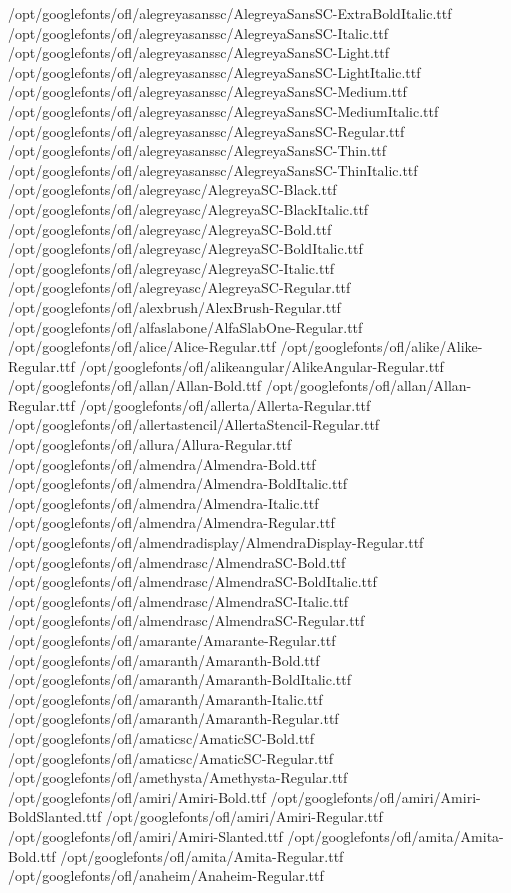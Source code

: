 /opt/googlefonts/ofl/alegreyasanssc/AlegreyaSansSC-ExtraBoldItalic.ttf
/opt/googlefonts/ofl/alegreyasanssc/AlegreyaSansSC-Italic.ttf
/opt/googlefonts/ofl/alegreyasanssc/AlegreyaSansSC-Light.ttf
/opt/googlefonts/ofl/alegreyasanssc/AlegreyaSansSC-LightItalic.ttf
/opt/googlefonts/ofl/alegreyasanssc/AlegreyaSansSC-Medium.ttf
/opt/googlefonts/ofl/alegreyasanssc/AlegreyaSansSC-MediumItalic.ttf
/opt/googlefonts/ofl/alegreyasanssc/AlegreyaSansSC-Regular.ttf
/opt/googlefonts/ofl/alegreyasanssc/AlegreyaSansSC-Thin.ttf
/opt/googlefonts/ofl/alegreyasanssc/AlegreyaSansSC-ThinItalic.ttf
/opt/googlefonts/ofl/alegreyasc/AlegreyaSC-Black.ttf
/opt/googlefonts/ofl/alegreyasc/AlegreyaSC-BlackItalic.ttf
/opt/googlefonts/ofl/alegreyasc/AlegreyaSC-Bold.ttf
/opt/googlefonts/ofl/alegreyasc/AlegreyaSC-BoldItalic.ttf
/opt/googlefonts/ofl/alegreyasc/AlegreyaSC-Italic.ttf
/opt/googlefonts/ofl/alegreyasc/AlegreyaSC-Regular.ttf
/opt/googlefonts/ofl/alexbrush/AlexBrush-Regular.ttf
/opt/googlefonts/ofl/alfaslabone/AlfaSlabOne-Regular.ttf
/opt/googlefonts/ofl/alice/Alice-Regular.ttf
/opt/googlefonts/ofl/alike/Alike-Regular.ttf
/opt/googlefonts/ofl/alikeangular/AlikeAngular-Regular.ttf
/opt/googlefonts/ofl/allan/Allan-Bold.ttf
/opt/googlefonts/ofl/allan/Allan-Regular.ttf
/opt/googlefonts/ofl/allerta/Allerta-Regular.ttf
/opt/googlefonts/ofl/allertastencil/AllertaStencil-Regular.ttf
/opt/googlefonts/ofl/allura/Allura-Regular.ttf
/opt/googlefonts/ofl/almendra/Almendra-Bold.ttf
/opt/googlefonts/ofl/almendra/Almendra-BoldItalic.ttf
/opt/googlefonts/ofl/almendra/Almendra-Italic.ttf
/opt/googlefonts/ofl/almendra/Almendra-Regular.ttf
/opt/googlefonts/ofl/almendradisplay/AlmendraDisplay-Regular.ttf
/opt/googlefonts/ofl/almendrasc/AlmendraSC-Bold.ttf
/opt/googlefonts/ofl/almendrasc/AlmendraSC-BoldItalic.ttf
/opt/googlefonts/ofl/almendrasc/AlmendraSC-Italic.ttf
/opt/googlefonts/ofl/almendrasc/AlmendraSC-Regular.ttf
/opt/googlefonts/ofl/amarante/Amarante-Regular.ttf
/opt/googlefonts/ofl/amaranth/Amaranth-Bold.ttf
/opt/googlefonts/ofl/amaranth/Amaranth-BoldItalic.ttf
/opt/googlefonts/ofl/amaranth/Amaranth-Italic.ttf
/opt/googlefonts/ofl/amaranth/Amaranth-Regular.ttf
/opt/googlefonts/ofl/amaticsc/AmaticSC-Bold.ttf
/opt/googlefonts/ofl/amaticsc/AmaticSC-Regular.ttf
/opt/googlefonts/ofl/amethysta/Amethysta-Regular.ttf
/opt/googlefonts/ofl/amiri/Amiri-Bold.ttf
/opt/googlefonts/ofl/amiri/Amiri-BoldSlanted.ttf
/opt/googlefonts/ofl/amiri/Amiri-Regular.ttf
/opt/googlefonts/ofl/amiri/Amiri-Slanted.ttf
/opt/googlefonts/ofl/amita/Amita-Bold.ttf
/opt/googlefonts/ofl/amita/Amita-Regular.ttf
/opt/googlefonts/ofl/anaheim/Anaheim-Regular.ttf
